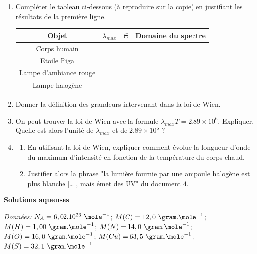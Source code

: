 \begin{enumerate}
\item Compléter le tableau ci-dessous (à reproduire sur la copie) en justifiant les résultats de la première ligne.

\begin{center}
\begin{tabular}{|c|c|c|c|}
\hline
Objet & $\lambda_{max}$ & $\Theta$ & Domaine du spectre \\
\hline
Corps humain &      &       &       \\
\hline
Etoile Riga &       &       &       \\
\hline
Lampe d'ambiance rouge  &       &       &   \\
\hline
Lampe halogène  &       &       &       \\
\hline
\end{tabular}
\end{center}

\item Donner la définition des grandeurs intervenant dans la loi de Wien.

\item On peut trouver la loi de Wien avec la formule $\lambda_{max} T = 2.89 \times 10^{6}$. Expliquer. Quelle est alors l'unité de $\lambda_{max}$ et de $2.89 \times 10^{6}$ ?

\item \begin{enumerate}[label=(\alph*)]
\item En utilisant la loi de Wien, expliquer comment évolue la longueur d'onde du maximum d'intensité en fonction de la température du corps chaud.
\item Justifier alors la phrase "la lumière fournie par une ampoule halogène est plus blanche […], mais émet
des UV" du document $4$.
\end{enumerate}

\end{enumerate}

\vspace{0.3cm}

\exo \textbf{Solutions aqueuses}

\vspace{0.3cm}

\textit{Données: }$N_{A} = 6,02.10^{23}\text{ }\mole^{-1}$; $M(C) = 12,0\text{ }\gram.\mole^{-1}$; $M(H) = 1,00\text{ }\gram.\mole^{-1}$; $M(N) = 14,0\text{ }\gram.\mole^{-1}$; $M(O) = 16,0\text{ }\gram.\mole^{-1}$; $M(Cu)=63,5\text{ }\gram.\mole^{-1}$; $M(S)=32,1\text{ }\gram.\mole^{-1}$

